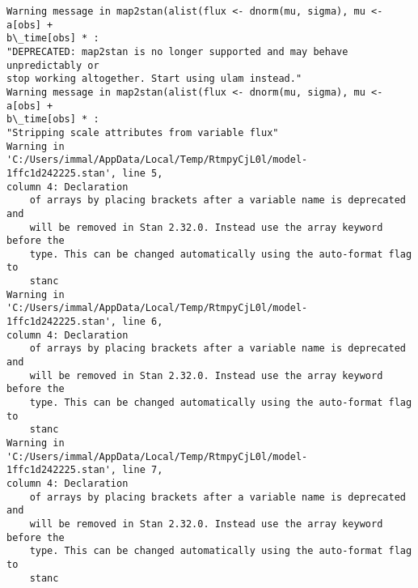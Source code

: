 \documentclass[11pt]{article}
\begin{document}
    \begin{Verbatim}[commandchars=\\\{\}]
Warning message in map2stan(alist(flux <- dnorm(mu, sigma), mu <- a[obs] +
b\_time[obs] * :
"DEPRECATED: map2stan is no longer supported and may behave unpredictably or
stop working altogether. Start using ulam instead."
Warning message in map2stan(alist(flux <- dnorm(mu, sigma), mu <- a[obs] +
b\_time[obs] * :
"Stripping scale attributes from variable flux"
Warning in
'C:/Users/immal/AppData/Local/Temp/RtmpyCjL0l/model-1ffc1d242225.stan', line 5,
column 4: Declaration
    of arrays by placing brackets after a variable name is deprecated and
    will be removed in Stan 2.32.0. Instead use the array keyword before the
    type. This can be changed automatically using the auto-format flag to
    stanc
Warning in
'C:/Users/immal/AppData/Local/Temp/RtmpyCjL0l/model-1ffc1d242225.stan', line 6,
column 4: Declaration
    of arrays by placing brackets after a variable name is deprecated and
    will be removed in Stan 2.32.0. Instead use the array keyword before the
    type. This can be changed automatically using the auto-format flag to
    stanc
Warning in
'C:/Users/immal/AppData/Local/Temp/RtmpyCjL0l/model-1ffc1d242225.stan', line 7,
column 4: Declaration
    of arrays by placing brackets after a variable name is deprecated and
    will be removed in Stan 2.32.0. Instead use the array keyword before the
    type. This can be changed automatically using the auto-format flag to
    stanc


    \end{Verbatim}
\end{document}
